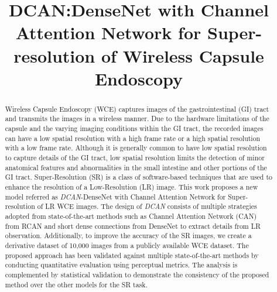 \documentclass[conference]{IEEEtran}
\begin{document}

\author{
}
\title{DCAN:DenseNet with Channel Attention Network for Super-resolution of Wireless Capsule Endoscopy}
\maketitle
\begin{abstract}
Wireless Capsule Endoscopy (WCE) captures images of the gastrointestinal (GI) tract and transmits the images in a wireless manner. Due to the hardware limitations of the capsule and the varying imaging conditions within the GI tract, the recorded images can have a low spatial resolution with a high frame rate or a high spatial resolution with a low frame rate. Although it is generally common to have low spatial resolution to capture details of the GI tract, low spatial resolution limits the detection of minor anatomical features and abnormalities in the small intestine and other portions of the GI tract. Super-Resolution (SR) is a class of software-based techniques that are used to enhance the resolution of a Low-Resolution (LR) image. This work proposes a new model referred as \emph{DCAN}-DenseNet with Channel Attention Network for Super-resolution of LR WCE images. The design of \emph{DCAN} consists of multiple strategies adopted from state-of-the-art methods such as Channel Attention Network (CAN) from RCAN and short dense connections from DenseNet to extract details from LR observation. Additionally, to improve the accuracy of the SR images, we create a derivative dataset of 10,000 images from a publicly available WCE dataset. The proposed approach has been validated against multiple state-of-the-art methods by conducting quantitative evaluation using perceptual metrics. 
The analysis is complemented by statistical validation to demonstrate the consistency of the proposed method over the other models for the SR task.

\end{abstract}
\end{document}
